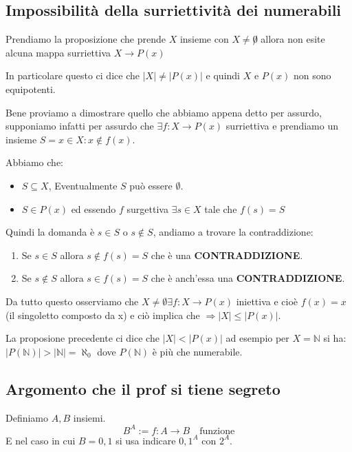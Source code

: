 \documentclass{article}
\theoremstyle{definition}
\begin{document}
\subsection{Impossibilità della surriettività dei numerabili}
Prendiamo la proposizione che prende $X$ insieme con $X \not =  \not 0$ allora non esite alcuna mappa surriettiva $X \to P(x)$ \par
In particolare questo ci dice che $|X| \not = |P(x)|$ e quindi $X$ e $P(x)$ non sono equipotenti.

Bene proviamo a dimostrare quello che abbiamo appena detto per assurdo, supponiamo infatti per assurdo che $\exists f : X \to P(x)$ surriettiva e prendiamo un insieme $S = {x \in X : x \not \in f(x)}$. \par 
Abbiamo che:
\begin{itemize}
        \item $S \subseteq X$, Eventualmente $S$ può essere $\emptyset$.
        \item $S \in P(x)$ ed essendo $f$ surgettiva $\exists s \in X$ tale che $f(s) = S$ 
\end{itemize}
Quindi la domanda è $s \in S$ o $s \not \in S$, andiamo a trovare la contraddizione:
\begin{enumerate}
        \item Se $s \in S$ allora $s \not \in f(s) = S$ che è una \textbf{CONTRADDIZIONE}.
        \item Se $s \not \in S$ allora $s \in f(s) = S$ che è anch'essa una \textbf{CONTRADDIZIONE}.
\end{enumerate}

Da tutto questo osserviamo che $X \not = \emptyset \exists f : X \to P(x)$ iniettiva e cioè $f(x) = {x}$ (il singoletto composto da x) e ciò implica che $\Rightarrow |X| \le |P(x)|$. 

La proposione precedente ci dice che $|X| < |P(x)|$ ad esempio per $X = \mathbb{N}$ si ha: \newline
$|P(\mathbb{N})| > |\mathbb{N}| = \aleph_0 $ dove $P(\mathbb{N})$ è più che numerabile.


\subsection{Argomento che il prof si tiene segreto}
Definiamo $A,B$ insiemi.
\begin{equation}
        B^A := {f:A \to B \quad \mbox{funzione}}
\end{equation}
E nel caso in cui $B = {0,1}$ si usa indicare ${0,1}^A$ con $2^A$.
\end{document}
